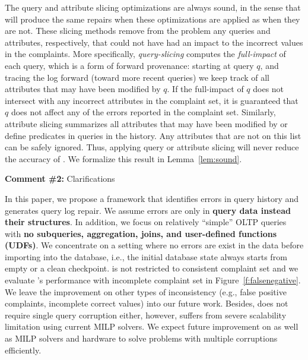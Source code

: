 The query and attribute slicing optimizations are always sound, in the sense
that \sys will produce the same repairs when these optimizations are applied
as when they are not. These slicing methods remove from the problem any
queries and attributes, respectively, that could not have had an impact
to the incorrect values in the complaints. More specifically,
\emph{query-slicing} computes the \emph{full-impact} of each query, which is a
form of forward provenance: starting at query $q$, and tracing the log forward
(toward more recent queries) we keep track of all attributes that may have
been modified by $q$. If the full-impact of $q$ does not intersect with any
incorrect attributes in the complaint set, it is guaranteed that $q$ does not
affect any of the errors reported in the complaint set. Similarly, attribute
slicing summarizes all attributes that may have been modified by or define
predicates in queries in the history. Any attributes that are not on this list
can be safely ignored. Thus, applying query or attribute slicing will never
reduce the accuracy of \sys. We formalize this result in
Lemma~\ref{lem:sound}.


 
\comskip

\noindent
\textbf{Comment \#2:} Clarifications
\begin{quote}
\end{quote}

In this paper, we propose a framework \sys that identifies errors in query history and generates query log repair. 
We assume errors are only in \textbf{query data instead their structures}. In addition, we focus on relatively 
``simple'' OLTP queries with \textbf{no subqueries, aggregation, joins, and user-defined functions (UDFs)}. 
We concentrate on a setting where no errors are exist in the data before importing into the database, i.e., 
the initial database state always starts from empty or a clean checkpoint. \sys is not restricted to consistent 
complaint set and we evaluate \sys's performance with incomplete complaint set in Figure~\ref{f:falsenegative}. 
We leave the improvement on other types of inconsistency (e.g., false positive complaints, incomplete correct
values) into our future work. Besides, \sys does not require single query corruption either, however, \sys 
suffers from severe scalability limitation using current MILP solvers. We expect future improvement on \sys
as well as MILP solvers and hardware to solve problems with multiple corruptions efficiently. 

